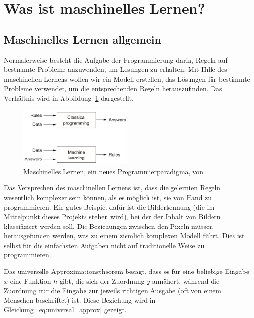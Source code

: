 \section{Was ist maschinelles Lernen?} \label{ch:what_is_ml}

\subsection{Maschinelles Lernen allgemein}

Normalerweise besteht die Aufgabe der Programmierung darin, Regeln auf bestimmte Probleme anzuwenden, um Lösungen zu erhalten.
Mit Hilfe des maschinellen Lernens wollen wir ein Modell erstellen, das Lösungen für bestimmte Probleme verwendet, um die entsprechenden Regeln herauszufinden.
Das Verhältnis wird in Abbildung~\ref{fig:cp_vs_ml} dargestellt.

\begin{figure}
    \centering
    \includegraphics[width=0.5\textwidth]{images/classical_prog_vs_ml.png}
    \caption{Maschinelles Lernen, ein neues Programmierparadigma, von \cite[S.5]{Chollet2017}}
    \label{fig:cp_vs_ml}
\end{figure}

Das Versprechen des maschinellen Lernens ist, dass die gelernten Regeln wesentlich komplexer sein können, als es möglich ist, sie von Hand zu programmieren.
Ein gutes Beispiel dafür ist die Bilderkennung (die im Mittelpunkt dieses Projekts stehen wird), bei der der Inhalt von Bildern klassifiziert werden soll.
Die Beziehungen zwischen den Pixeln müssen herausgefunden werden, was zu einem ziemlich komplexen Modell führt.
Dies ist selbst für die einfachsten Aufgaben nicht auf traditionelle Weise zu programmieren.

Das universelle Approximationstheorem \cite{Cybenko1989} \cite{Hornik1989} besagt, dass es für eine beliebige Eingabe $x$ eine Funktion $h$ gibt, die sich der Zuordnung $y$ annähert, während die Zuordnung nur die Eingabe zur jeweils richtigen Ausgabe (oft von einem Menschen beschriftet) ist.
Diese Beziehung wird in Gleichung~\eqref{eq:universal_approx} gezeigt.

